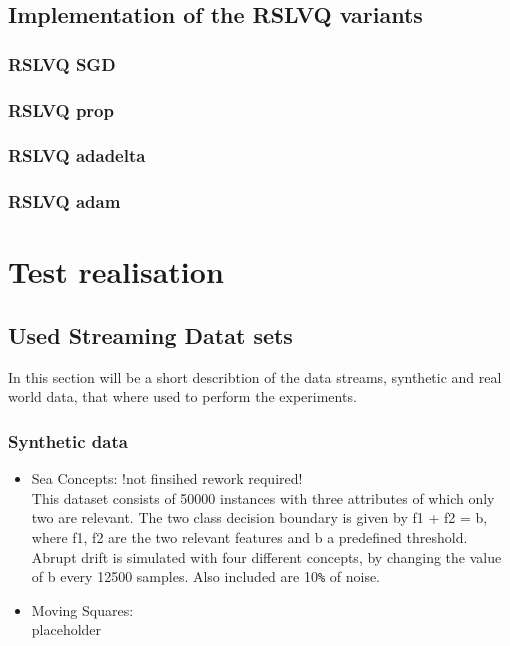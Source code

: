 \documentclass[12pt,oneside,a4paper,parskip]{scrbook}
\begin{document}
\section{Implementation of the RSLVQ variants}

\subsection{RSLVQ SGD}

\subsection{RSLVQ prop}

\subsection{RSLVQ adadelta}

\subsection{RSLVQ adam}

\chapter{Test realisation}

\section{Used Streaming Datat sets}

In this section will be a short describtion of the data streams, synthetic and real world data, that where used to 
perform the experiments.

\subsection{Synthetic data}

\begin{itemize}
  \item Sea Concepts: !not finsihed rework required!\\
        This dataset consists of 50000 instances with three attributes of which only two are relevant. 
        The two class decision boundary is given by f1 + f2 = b, where f1, f2 are the two relevant features and b a
        predefined threshold. Abrupt drift is simulated with four different concepts, by changing the value of b every 
        12500 samples. Also included are 10\verb|%| of noise. \cite{SEADataset}
  \item Moving Squares: \\
        placeholder
\end{itemize}
\end{document}

